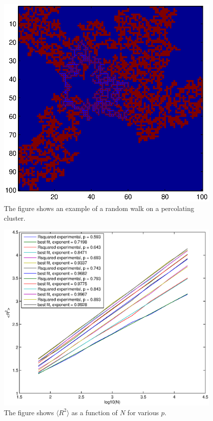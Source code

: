 \documentclass[12pt]{article}
\begin{document}
\begin{figure}[ht]
\centering

	\includegraphics[width=13cm]{percex.eps}


\caption[Optional caption for list of figures]{The figure shows an example of a random walk on a percolating cluster.}
\label{fig:13}
\end{figure}

\begin{figure}[ht]
\centering

	\includegraphics[width=13cm]{rofn.eps}


\caption[Optional caption for list of figures]{The figure shows $\langle R^2 \rangle$ as a function of $N$ for various $p$.}
\label{fig:14}
\end{figure}
\end{document}
